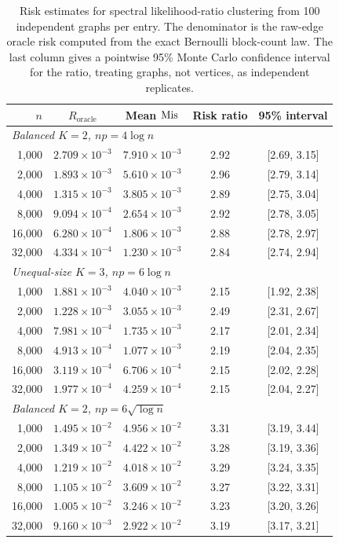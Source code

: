 \begin{table}[htbp]
\centering\small
\caption{Risk estimates for spectral likelihood-ratio clustering from 100 independent graphs per entry. The denominator is the raw-edge oracle risk computed from the exact Bernoulli block-count law. The last column gives a pointwise 95\% Monte Carlo confidence interval for the ratio, treating graphs, not vertices, as independent replicates.}\label{tab:experiment-risks}
\begin{tabular}{rcccc}
\toprule
$n$ & $R_{\mathrm{oracle}}$ & Mean $\operatorname{Mis}$ & Risk ratio & 95\% interval\\
\midrule
\multicolumn{5}{l}{\textit{Balanced $K=2$, $np=4\log n$}}\\[2pt]
1,000 & $2.709\times10^{-3}$ & $7.910\times10^{-3}$ & 2.92 & [2.69, 3.15]\\
2,000 & $1.893\times10^{-3}$ & $5.610\times10^{-3}$ & 2.96 & [2.79, 3.14]\\
4,000 & $1.315\times10^{-3}$ & $3.805\times10^{-3}$ & 2.89 & [2.75, 3.04]\\
8,000 & $9.094\times10^{-4}$ & $2.654\times10^{-3}$ & 2.92 & [2.78, 3.05]\\
16,000 & $6.280\times10^{-4}$ & $1.806\times10^{-3}$ & 2.88 & [2.78, 2.97]\\
32,000 & $4.334\times10^{-4}$ & $1.230\times10^{-3}$ & 2.84 & [2.74, 2.94]\\
\midrule
\multicolumn{5}{l}{\textit{Unequal-size $K=3$, $np=6\log n$}}\\[2pt]
1,000 & $1.881\times10^{-3}$ & $4.040\times10^{-3}$ & 2.15 & [1.92, 2.38]\\
2,000 & $1.228\times10^{-3}$ & $3.055\times10^{-3}$ & 2.49 & [2.31, 2.67]\\
4,000 & $7.981\times10^{-4}$ & $1.735\times10^{-3}$ & 2.17 & [2.01, 2.34]\\
8,000 & $4.913\times10^{-4}$ & $1.077\times10^{-3}$ & 2.19 & [2.04, 2.35]\\
16,000 & $3.119\times10^{-4}$ & $6.706\times10^{-4}$ & 2.15 & [2.02, 2.28]\\
32,000 & $1.977\times10^{-4}$ & $4.259\times10^{-4}$ & 2.15 & [2.04, 2.27]\\
\midrule
\multicolumn{5}{l}{\textit{Balanced $K=2$, $np=6\sqrt{\log n}$}}\\[2pt]
1,000 & $1.495\times10^{-2}$ & $4.956\times10^{-2}$ & 3.31 & [3.19, 3.44]\\
2,000 & $1.349\times10^{-2}$ & $4.422\times10^{-2}$ & 3.28 & [3.19, 3.36]\\
4,000 & $1.219\times10^{-2}$ & $4.018\times10^{-2}$ & 3.29 & [3.24, 3.35]\\
8,000 & $1.105\times10^{-2}$ & $3.609\times10^{-2}$ & 3.27 & [3.22, 3.31]\\
16,000 & $1.005\times10^{-2}$ & $3.246\times10^{-2}$ & 3.23 & [3.20, 3.26]\\
32,000 & $9.160\times10^{-3}$ & $2.922\times10^{-2}$ & 3.19 & [3.17, 3.21]\\
\bottomrule\end{tabular}\end{table}

